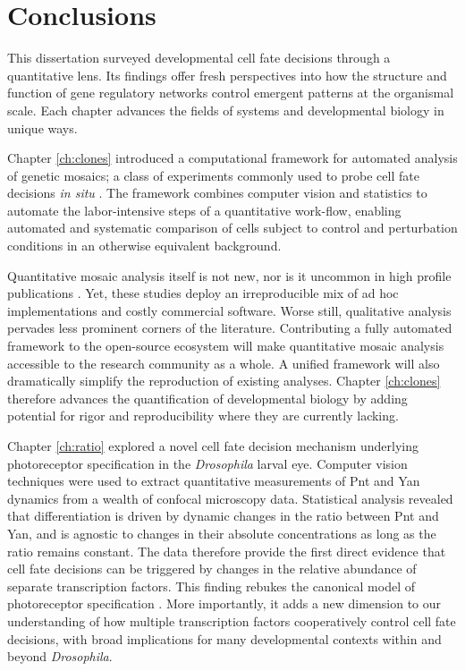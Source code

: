 \chapter{Conclusions}
\label{ch:conclusion}

This dissertation surveyed developmental cell fate decisions through a quantitative lens. Its findings offer fresh perspectives into how the structure and function of gene regulatory networks control emergent patterns at the organismal scale. Each chapter advances the fields of systems and developmental biology in unique ways.

Chapter \ref{ch:clones} introduced a computational framework for automated analysis of genetic mosaics; a class of experiments commonly used to probe cell fate decisions \textit{in situ} \cite{Germani2018,Atkins2019}. The framework combines computer vision and statistics to automate the labor-intensive steps of a quantitative work-flow, enabling automated and systematic comparison of cells subject to control and perturbation conditions in an otherwise equivalent background.

Quantitative mosaic analysis itself is not new, nor is it uncommon in high profile publications \cite{Dai2017,Gavish2016,Li2018}. Yet, these studies deploy an irreproducible mix of ad hoc implementations and costly commercial software. Worse still, qualitative analysis pervades less prominent corners of the literature. Contributing a fully automated framework to the open-source ecosystem will make quantitative mosaic analysis accessible to the research community as a whole. A unified framework will also dramatically simplify the reproduction of existing analyses. Chapter \ref{ch:clones} therefore advances the quantification of developmental biology by adding potential for rigor and reproducibility where they are currently lacking.

Chapter \ref{ch:ratio} explored a novel cell fate decision mechanism underlying photoreceptor specification in the \textit{Drosophila} larval eye. Computer vision techniques were used to extract quantitative measurements of Pnt and Yan dynamics from a wealth of confocal microscopy data. Statistical analysis revealed that differentiation is driven by dynamic changes in the ratio between Pnt and Yan, and is agnostic to changes in their absolute concentrations as long as the ratio remains constant. The data therefore provide the first direct evidence that cell fate decisions can be triggered by changes in the relative abundance of separate transcription factors. This finding rebukes the canonical model of photoreceptor specification \cite{Graham2010}. More importantly, it adds a new dimension to our understanding of how multiple transcription factors cooperatively control cell fate decisions, with broad implications for many developmental contexts within and beyond \textit{Drosophila}. 

